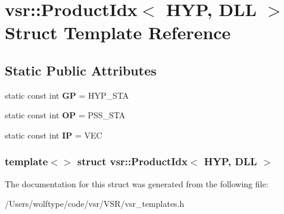 \hypertarget{structvsr_1_1_product_idx_3_01_h_y_p_00_01_d_l_l_01_4}{\section{vsr\-:\-:Product\-Idx$<$ H\-Y\-P, D\-L\-L $>$ Struct Template Reference}
\label{structvsr_1_1_product_idx_3_01_h_y_p_00_01_d_l_l_01_4}
}
\subsection*{Static Public Attributes}
\begin{DoxyCompactItemize}
\item 
\hypertarget{structvsr_1_1_product_idx_3_01_h_y_p_00_01_d_l_l_01_4_a214c06c3c48ed7f54776f5c282d60b8a}{static const int {\bfseries G\-P} = H\-Y\-P\-\_\-\-S\-T\-A}\label{structvsr_1_1_product_idx_3_01_h_y_p_00_01_d_l_l_01_4_a214c06c3c48ed7f54776f5c282d60b8a}

\item 
\hypertarget{structvsr_1_1_product_idx_3_01_h_y_p_00_01_d_l_l_01_4_ad07db1359dd902af74e1e43caac72a0b}{static const int {\bfseries O\-P} = P\-S\-S\-\_\-\-S\-T\-A}\label{structvsr_1_1_product_idx_3_01_h_y_p_00_01_d_l_l_01_4_ad07db1359dd902af74e1e43caac72a0b}

\item 
\hypertarget{structvsr_1_1_product_idx_3_01_h_y_p_00_01_d_l_l_01_4_a361af8ac47966a76213d6476395a3719}{static const int {\bfseries I\-P} = V\-E\-C}\label{structvsr_1_1_product_idx_3_01_h_y_p_00_01_d_l_l_01_4_a361af8ac47966a76213d6476395a3719}

\end{DoxyCompactItemize}
\subsubsection*{template$<$$>$ struct vsr\-::\-Product\-Idx$<$ H\-Y\-P, D\-L\-L $>$}



The documentation for this struct was generated from the following file\-:\begin{DoxyCompactItemize}
\item 
/\-Users/wolftype/code/vsr/\-V\-S\-R/vsr\-\_\-templates.\-h\end{DoxyCompactItemize}

